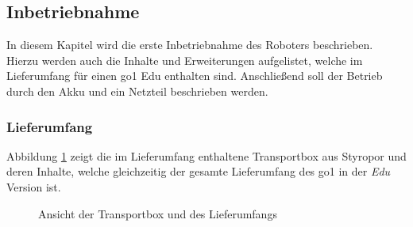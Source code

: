 \subsection{Inbetriebnahme}
\label{subsec:inbetriebnahme}

In diesem Kapitel wird die erste Inbetriebnahme des Roboters beschrieben.
Hierzu werden auch die Inhalte und Erweiterungen aufgelistet, welche im Lieferumfang für einen \gls{go1} Edu enthalten sind.
Anschließend soll der Betrieb durch den Akku und ein Netzteil beschrieben werden.

\subsubsection{Lieferumfang}

Abbildung \ref{fig:lieferumfang} zeigt die im Lieferumfang enthaltene Transportbox aus Styropor und deren Inhalte, welche
gleichzeitig der gesamte Lieferumfang des \gls{go1} in der \emph{Edu} Version ist.

\begin{figure}[h]
    \caption{Ansicht der Transportbox und des Lieferumfangs}\label{fig:lieferumfang}
\end{figure}